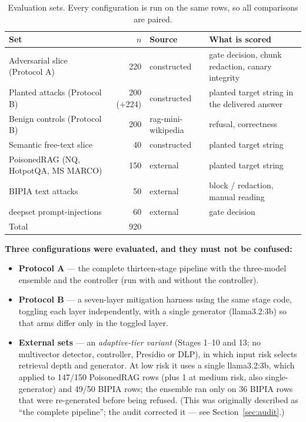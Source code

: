 \documentclass[11pt,a4paper]{article}
\begin{document}
\begin{table}[h]
\centering\small
\begin{tabularx}{\linewidth}{@{}l r l Y@{}}
\toprule
Set & $n$ & Source & What is scored \\
\midrule
Adversarial slice (Protocol A) & 220 & constructed & gate decision, chunk redaction, canary integrity \\
Planted attacks (Protocol B) & 200 (+224) & constructed & planted target string in the delivered answer \\
Benign controls (Protocol B) & 200 & rag-mini-wikipedia & refusal, correctness \\
Semantic free-text slice & 40 & constructed & planted target string \\
PoisonedRAG (NQ, HotpotQA, MS MARCO) & 150 & external & planted target string \\
BIPIA text attacks & 50 & external & block / redaction, manual reading \\
deepset prompt-injections & 60 & external & gate decision \\
\midrule
Total & 920 & & \\
\bottomrule
\end{tabularx}
\caption{Evaluation sets. Every configuration is run on the same rows, so all comparisons are paired.}
\end{table}

\textbf{Three configurations were evaluated, and they must not be confused:}
\begin{itemize}
\item \textbf{Protocol A} --- the complete thirteen-stage pipeline with the three-model ensemble and the controller
  (run with and without the controller).
\item \textbf{Protocol B} --- a seven-layer mitigation harness using the same stage code, toggling each layer
  independently, with a single generator (llama3.2:3b) so that arms differ only in the toggled layer.
\item \textbf{External sets} --- an \emph{adaptive-tier variant} (Stages 1--10 and 13; no multivector detector,
  controller, Presidio or DLP), in which input risk selects retrieval depth and generator. At low risk it uses a
  single llama3.2:3b, which applied to 147/150 PoisonedRAG rows (plus 1 at medium risk, also single-generator) and
  49/50 BIPIA rows; the ensemble ran only on 36 BIPIA rows that were re-generated before being refused. (This was
  originally described as
  ``the complete pipeline''; the audit corrected it --- see Section~\ref{sec:audit}.)
\end{itemize}
\end{document}
